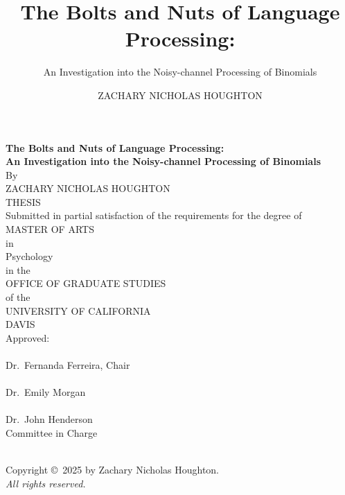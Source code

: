 \documentclass[
  12pt,
]{scrartcl}
\title{The Bolts and Nuts of Language Processing:}
\subtitle{An Investigation into the Noisy-channel Processing of
Binomials}
\author{ZACHARY NICHOLAS HOUGHTON}
\date{}
\begin{document}
\cleardoublepage
\thispagestyle{plain}
\begin{center}
   \null\vfill
   \textbf{%
      The Bolts and Nuts of Language Processing:\\
	  An Investigation into the Noisy-channel Processing of Binomials
   }%
   \\
   \bigskip
   By \\
   \bigskip
   {ZACHARY NICHOLAS HOUGHTON}
\\   
   THESIS \\
   \bigskip
   Submitted in partial satisfaction of the requirements for the
   degree of \\
   \bigskip
   MASTER OF ARTS \\
   \bigskip
   in \\
   \bigskip
   {Psychology} \\ 
      \bigskip
   in the \\
   \bigskip
   OFFICE OF GRADUATE STUDIES \\
   \bigskip        
   of the \\
   \bigskip
   UNIVERSITY OF CALIFORNIA \\
   \bigskip
   DAVIS \\
   \bigskip
   Approved: \\
   \bigskip
   \bigskip
   \makebox[3in]{\hrulefill} \\
   Dr.~Fernanda Ferreira, Chair \\
   \bigskip
   \bigskip
   \makebox[3in]{\hrulefill} \\
   Dr.~Emily Morgan \\
   \bigskip
   \bigskip
   \makebox[3in]{\hrulefill} \\
   Dr.~John Henderson \\
   \bigskip
   Committee in Charge \\
    \\
   \vfill
\end{center}


\newpage
{}
\setcounter{savedpage}{\value{page}}

\thispagestyle{empty}
\begin{titlepage}
\begin{center}
  Copyright \copyright\ 2025 by Zachary Nicholas Houghton. \\
  \textit{All rights reserved.}
\end{center}
\end{titlepage}
\end{document}
